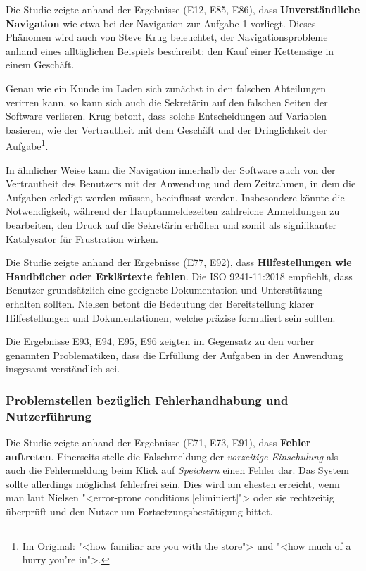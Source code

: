 Die Studie zeigte anhand der Ergebnisse (E12, E85, E86), dass \textbf{Unverständliche Navigation} wie etwa bei der Navigation zur Aufgabe 1 vorliegt. Dieses Phänomen wird auch von Steve Krug beleuchtet, der Navigationsprobleme anhand eines alltäglichen Beispiels beschreibt: den Kauf einer Kettensäge in einem Geschäft.

Genau wie ein Kunde im Laden sich zunächst in den falschen Abteilungen verirren kann, so kann sich auch die Sekretärin auf den falschen Seiten der Software verlieren. Krug betont, dass solche Entscheidungen auf Variablen basieren, wie der Vertrautheit mit dem Geschäft und der Dringlichkeit der Aufgabe\footnote{Im Original: "<how familiar are you with the store"> und "<how much of a hurry you're in">.}.\cite{krug}

In ähnlicher Weise kann die Navigation innerhalb der Software auch von der Vertrautheit des Benutzers mit der Anwendung und dem Zeitrahmen, in dem die Aufgaben erledigt werden müssen, beeinflusst werden. Insbesondere könnte die Notwendigkeit, während der Hauptanmeldezeiten zahlreiche Anmeldungen zu bearbeiten, den Druck auf die Sekretärin erhöhen und somit als signifikanter Katalysator für Frustration wirken.

Die Studie zeigte anhand der Ergebnisse (E77, E92), dass \textbf{Hilfestellungen wie Handbücher oder Erklärtexte fehlen}. Die ISO 9241-11:2018 empfiehlt, dass Benutzer grundsätzlich eine geeignete Dokumentation und Unterstützung erhalten sollten.\cite{ISO9241-11} Nielsen betont die Bedeutung der Bereitstellung klarer Hilfestellungen und Dokumentationen, welche präzise formuliert sein sollten.\cite{Nielsen10}

Die Ergebnisse E93, E94, E95, E96 zeigten im Gegensatz zu den vorher genannten Problematiken, dass die Erfüllung der Aufgaben in der Anwendung insgesamt verständlich sei.

\subsubsection{Problemstellen bezüglich Fehlerhandhabung und Nutzerführung}
Die Studie zeigte anhand der Ergebnisse (E71, E73, E91), dass \textbf{Fehler auftreten}. Einerseits stelle die Falschmeldung der \textit{vorzeitige Einschulung} als auch die Fehlermeldung beim Klick auf \textit{Speichern} einen Fehler dar. Das System sollte allerdings möglichst fehlerfrei sein. Dies wird am ehesten erreicht, wenn man laut Nielsen "<error-prone conditions [eliminiert]"> oder sie rechtzeitig überprüft und den Nutzer um Fortsetzungsbestätigung bittet. \cite{Nielsen10} 

